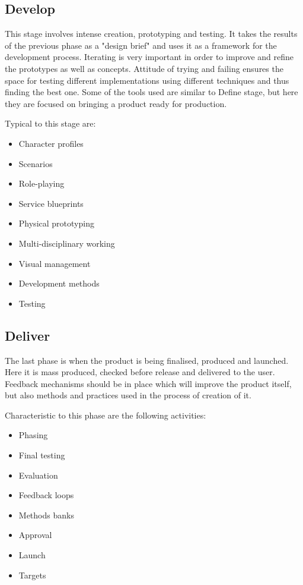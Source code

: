 		
		\subsection{Develop}
		
This stage involves intense creation, prototyping and testing. It takes the results of the previous phase as a "design brief" and uses it as a framework for the development process. Iterating is very important in order to improve and refine the prototypes as well as concepts. Attitude of trying and failing ensures the space for testing different implementations using different techniques and thus finding the best one. Some of the tools used are similar to Define stage, but here they are focused on bringing a product ready for production.

Typical to this stage are:
\begin{itemize}
\item Character profiles
\item Scenarios
\item Role-playing
\item Service blueprints
\item Physical prototyping
\item Multi-disciplinary working
\item Visual management
\item Development methods
\item Testing
\end{itemize}		
		
		\subsection{Deliver}

The last phase is when the product is being finalised, produced and launched. Here it is mass produced, checked before release and delivered to the user. Feedback mechanisms should be in place which will improve the product itself, but also methods and practices used in the process of creation of it.

Characteristic to this phase are the following activities:
\begin{itemize}
\item Phasing
\item Final testing
\item Evaluation
\item Feedback loops
\item Methods banks
\item Approval
\item Launch
\item Targets
\end{itemize}



